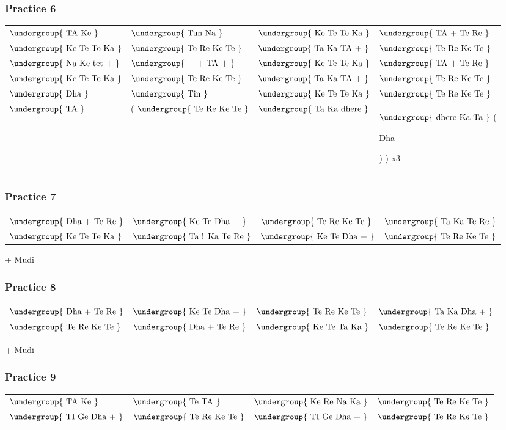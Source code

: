 \documentclass[12pt]{article}
\newcommand{\matra}[1]{$\undergroup{\text{#1}}$}
\newif\ifdoigt
\newcommand{\bol}[2]{%
  \ifdoigt
  \pbox[b]{2cm}
       {\hspace*{\fill}{\scriptsize #2}\\#1}
  \else
      {#1}
  \fi
}%
\def\Go{\bol{Ge}{1}}
\def\K{\bol{Ke}{}}
\def\Ka{\bol{Ka}{}}
\def\Ke{\bol{Ke}{}}
\def\To{\bol{Te}{gn1}}
\def\Ro{\bol{Re}{gn1}}
\def\Tt{\bol{Te}{g3}}
\def\Ta{\bol{Ta}{g3}}
\def\TI{\bol{TI}{gn1}}
\def\Rt{\bol{Re}{g3}}
\def\N{\bol{Na}{k}}
\def\TA{\bol{TA}{k}}
\def\Tu{\bol{Tun}{sn1}}
\def\TIN{\bol{Tin}{gsn4}}
\def\Da{\bol{Dha}{k/2}}
\def\Ka{\bol{Ka}{}}
\def\tet{\bol{tet}{g3}}
\def\dhere{\bol{dhere}{gflapflap}}
\def\cont{\bol{+}{}}
\newcommand{\double}[1]{%
  #1\bol{+}{}
  }%
\def\TRKT{\matra{\Tt \Ro \K \Tt}}
\def\KTTK{\matra{\K \Tt \To \Ka}}
\begin{document}
\subsubsection*{Practice 6}

\begin{tabular}{llll}
  \matra{\TA \Ke} & \matra{\Tu \N} & \KTTK & \matra{\double{\TA}\Tt\Ro} \\
  \KTTK & \TRKT & \matra{\Ta\Ka\double{\TA}} & \TRKT \\
  \matra{\N\Ke\double{\tet}} & \matra{\double{\cont}\double{\TA}} & \KTTK &   \matra{\double{\TA}\Tt\Ro} \\
  \KTTK & \TRKT & \matra{\Ta\Ka\double{\TA}} & \TRKT \\
  \matra{\Da} & \matra{\TIN} & \KTTK & \TRKT \\
  \matra{\TA} & ( \TRKT & \matra{\Ta\Ka\dhere} & \matra{\dhere\Ka\Ta} (\Da) ) x3
\end{tabular}

\subsubsection*{Practice 7}

\begin{tabular}{llll}
  \matra{\double{\Da}\Tt\Ro} & \matra{\K\Tt\double{\Da}} & \TRKT & \matra{\Ta\Ka\Tt\Ro} \\
  \KTTK & \matra{\Ta!\Ka\Tt\Ro} & \matra{\K\Tt\double{\Da}} & \TRKT
\end{tabular}
+ Mudi

\subsubsection*{Practice 8}

\begin{tabular}{llll}
  \matra{\double{\Da}\Tt\Ro} & \matra{\K\Tt\double{\Da}} & \TRKT & \matra{\Ta\Ka\double{\Da}} \\
  \TRKT & \matra{\double{\Da}\Tt\Ro} & \matra{\K\Tt\Ta\Ka}  & \TRKT
\end{tabular}
+ Mudi


\subsubsection*{Practice 9}

\begin{tabular}{llll}
  \matra{\TA\K} & \matra{\Tt\TA} & \matra{\K\Rt\N\Ka} & \TRKT \\
  \matra{\TI\Go\double{\Da}} & \TRKT & \matra{\TI\Go\double{\Da}} & \TRKT
\end{tabular}
\end{document}
